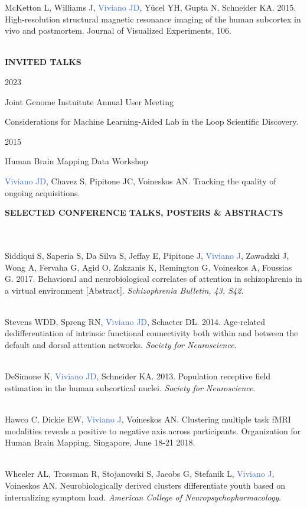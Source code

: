 \documentclass[a4paper,11pt,oneside]{book}
\newcommand{\entry}[4]{%
  \parbox[t]{2.5cm}{#1\hfill}\hspace{0cm}\parbox[t]{11.15cm}{%
    \textbf{#2}%
    \hfill%
    {\footnotesize\addfontfeature{Color=lightgray} #3}\
    \vspace{1.5mm}
    \begin{itemize}[leftmargin=-1.5cm]#4\end{itemize}\vspace{\parsep}%
  }}
\newcommand\sectionheading[1]{
    \normalsize
    \noindent
    \leftskip=0in
    \textbf{#1\\
    \vspace{4.5mm}}
}
\begin{document}
\begin{flushleft}
McKetton L, Williams J, \textcolor{highlight}{Viviano JD}, Yücel YH, Gupta N, Schneider KA. 2015. High-resolution structural magnetic resonance imaging of the human subcortex in vivo and postmortem. Journal of Visualized Experiments, 106. \\\

\sectionheading{INVITED TALKS}
\entry
{2023}
{}
{Joint Genome Instuitute Annual User Meeting}
{Considerations for Machine Learning-Aided Lab in the Loop Scientific Discovery.}

\entry
{2015}
{}
{Human Brain Mapping Data Workshop}
{\textcolor{highlight}{Viviano JD}, Chavez S, Pipitone JC, Voineskos AN. Tracking the quality of ongoing acquisitions.}

\sectionheading{SELECTED CONFERENCE TALKS, POSTERS \& ABSTRACTS} \\\

Siddiqui S, Saperia S, Da Silva S, Jeffay E, Pipitone J, \textcolor{highlight}{Viviano J}, Zawadzki J, Wong A, Fervaha G, Agid O, Zakzanis K, Remington G, Voineskos A, Foussias G. 2017. Behavioral and neurobiological correlates of attention in schizophrenia in a virtual environment [Abstract]. \textit{Schizophrenia Bulletin, 43, S42}. \\\

Stevens WDD, Spreng RN, \textcolor{highlight}{Viviano JD}, Schacter DL. 2014. Age-related dedifferentiation of intrinsic functional connectivity both within and between the default and dorsal attention networks. \textit{Society for Neuroscience}. \\\

DeSimone K, \textcolor{highlight}{Viviano JD}, Schneider KA. 2013. Population receptive field estimation in the human subcortical nuclei. \textit{Society for Neuroscience}. \\\

Hawco C, Dickie EW, \textcolor{highlight}{Viviano J}, Voineskos AN. Clustering multiple task fMRI modalities reveals a positive to negative axis across participants. Organization for Human Brain Mapping, Singapore, June 18-21 2018. \\\

Wheeler AL, Trossman R, Stojanovski S, Jacobs G, Stefanik L, \textcolor{highlight}{Viviano J}, Voineskos AN. Neurobiologically derived clusters differentiate youth based on internalizing symptom load. \textit{American College of Neuropsychopharmacology}. \\\


\end{flushleft}
\end{document}
